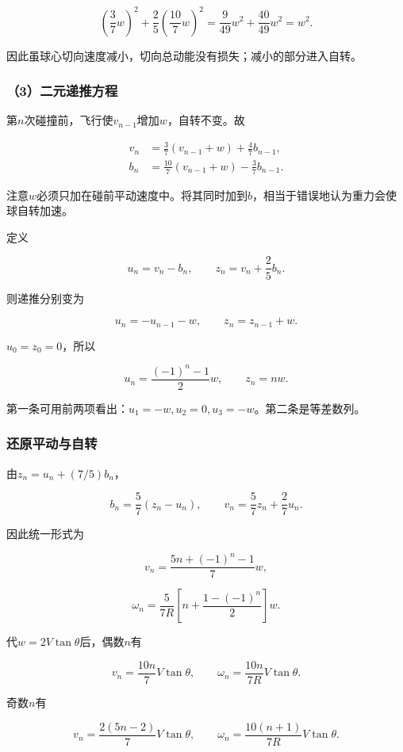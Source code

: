 \documentclass[12pt,a4paper,fontset=fandol]{ctexart}
\begin{document}
\[
\left(\frac37w\right)^2
+\frac25\left(\frac{10}{7}w\right)^2
=\frac9{49}w^2+\frac{40}{49}w^2=w^2.
\]

因此虽球心切向速度减小，切向总动能没有损失；减小的部分进入自转。

\subsubsection{（3）二元递推方程}\label{ux4e8cux5143ux9012ux63a8ux65b9ux7a0b}

第\(n\)次碰撞前，飞行使\(v_{n-1}\)增加\(w\)，自转不变。故

\[
\begin{aligned}
v_n&=\frac37(v_{n-1}+w)+\frac47b_{n-1},\\
b_n&=\frac{10}{7}(v_{n-1}+w)-\frac37b_{n-1}.
\end{aligned}
\]

注意\(w\)必须只加在碰前平动速度中。将其同时加到\(b\)，相当于错误地认为重力会使球自转加速。

定义

\[
u_n=v_n-b_n,\qquad
z_n=v_n+\frac25b_n.
\]

则递推分别变为

\[
u_n=-u_{n-1}-w,
\qquad z_n=z_{n-1}+w.
\]

\(u_0=z_0=0\)，所以

\[
u_n=\frac{(-1)^n-1}{2}w,
\qquad z_n=nw.
\]

第一条可用前两项看出：\(u_1=-w,u_2=0,u_3=-w\)。第二条是等差数列。

\subsubsection{还原平动与自转}\label{ux8fd8ux539fux5e73ux52a8ux4e0eux81eaux8f6c}

由\(z_n=u_n+(7/5)b_n\)，

\[
b_n=\frac57(z_n-u_n),
\qquad
v_n=\frac57z_n+\frac27u_n.
\]

因此统一形式为

\[
\boxed{v_n=\frac{5n+(-1)^n-1}{7}w},
\]

\[
\boxed{
\omega_n=\frac{5}{7R}
\left[n+\frac{1-(-1)^n}{2}\right]w}.
\]

代\(w=2V\tan\theta\)后，偶数\(n\)有

\[
\boxed{v_n=\frac{10n}{7}V\tan\theta,\qquad
\omega_n=\frac{10n}{7R}V\tan\theta}.
\]

奇数\(n\)有

\[
\boxed{v_n=\frac{2(5n-2)}7V\tan\theta,\qquad
\omega_n=\frac{10(n+1)}{7R}V\tan\theta}.
\]
\end{document}
